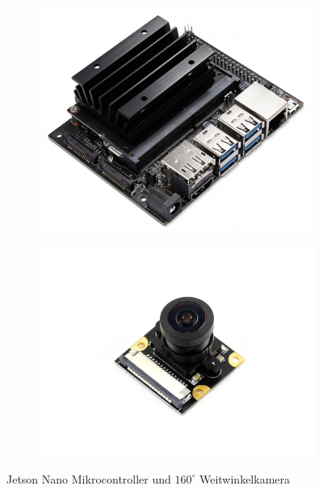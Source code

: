 \begin{figure}[H]
    \begin{subfigure}{0.5\textwidth}
        \includegraphics[width=0.9\linewidth]{Bilder/jetson-nano.jpg}
    \end{subfigure}
    \begin{subfigure}{0.5\textwidth}
        \includegraphics[width=0.9\linewidth]{Bilder/kamera.jpg}
    \end{subfigure}
    \label{fig:Bild3.1}
    \caption[Jetson Nano und Weitwinkelkamera]{Jetson Nano Mikrocontroller und $160^\circ$ Weitwinkelkamera}
\end{figure}

